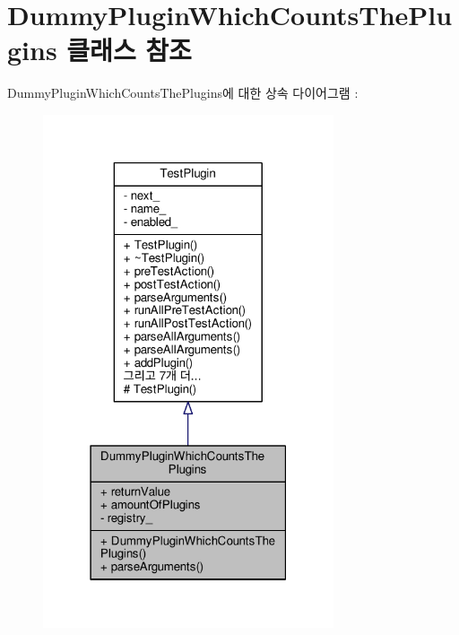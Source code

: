 \hypertarget{class_dummy_plugin_which_counts_the_plugins}{}\section{Dummy\+Plugin\+Which\+Counts\+The\+Plugins 클래스 참조}
\label{class_dummy_plugin_which_counts_the_plugins}


Dummy\+Plugin\+Which\+Counts\+The\+Plugins에 대한 상속 다이어그램 \+: 
\nopagebreak
\begin{figure}[H]
\begin{center}
\leavevmode
\includegraphics[width=243pt]{class_dummy_plugin_which_counts_the_plugins__inherit__graph}
\end{center}
\end{figure}


